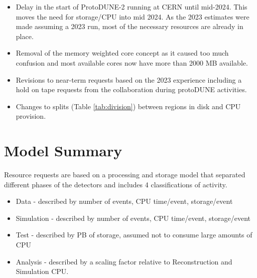 \documentclass[12pt]{article}
\begin{document}
\begin{itemize}
\item Delay in the start of ProtoDUNE-2 running at CERN until mid-2024. This moves the need for storage/CPU into mid 2024. As the 2023 estimates were made assuming a 2023 run, most of the necessary resources are already in place. 
\item Removal of the memory weighted core concept as it caused too much confusion and most available cores now have more than 2000 MB available. 
\item Revisions to near-term requests based on the 2023 experience including a hold on tape requests from the collaboration during protoDUNE activities. 
\item Changes to splits (Table \ref{tab:division}) between regions in disk and CPU provision. 
\end{itemize}

\section{Model Summary}

Resource requests are based on a processing and storage model that separated different phases of the detectors and includes 4 classifications of activity.

\begin{itemize}
\item Data - described by number of events, CPU time/event, storage/event
\item Simulation - described by number of events,  CPU time/event, storage/event
\item Test - described by PB of storage, assumed not to consume large amounts of CPU
\item Analysis - described by a scaling factor relative to Reconstruction and Simulation CPU.
\end{itemize}
\end{document}
